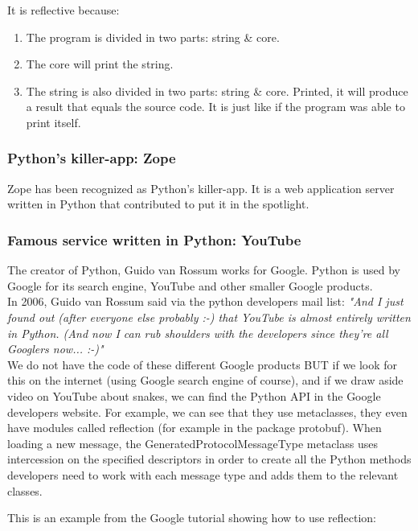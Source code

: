 It is reflective because:
\begin{enumerate}
    \item The program is divided in two parts: string \& core.
    \item The core will print the string.
    \item The string is also divided in two parts: string \& core. Printed, it will produce a result that equals the source code. It is just like if the program was able to print itself. 
\end{enumerate}

\subsubsection{Python's killer-app: Zope}
Zope has been recognized as Python's killer-app. It is a web application server written in Python that contributed to put it in the spotlight.

\subsubsection{Famous service written in Python: YouTube}
The creator of Python, Guido van Rossum works for Google. Python is used by Google for its search engine, YouTube and other smaller Google products.\\

In 2006, Guido van Rossum said via the python developers mail list:
\emph{"And I just found out (after everyone else probably :-) that YouTube is almost entirely written in Python. (And now I can rub shoulders with the developers since they're all Googlers now... :-)"}\\

We do not have the code of these different Google products BUT if we look for this on the internet (using Google search engine of course), and if we draw aside video on YouTube about snakes, we can find the Python API in the Google developers website. For example, we can see that they use metaclasses, they even have modules called reflection (for example in the package protobuf). When loading a new message, the GeneratedProtocolMessageType metaclass uses intercession on the specified descriptors in order to create all the Python methods developers need to work with each message type and adds them to the relevant classes. \cite{google_reflection_references, google_reflection_tutorial}

This is an example from the Google tutorial showing how to use reflection:



